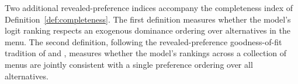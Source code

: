 Two additional revealed-preference indices accompany the completeness index of Definition~\ref{def:completeness}. The first definition measures whether the model's logit ranking respects an exogenous dominance ordering over alternatives in the menu. The second definition, following the revealed-preference goodness-of-fit tradition of \citet{houtman1985determining} and \citet{demuynck2023computing}, measures whether the model's rankings across a collection of menus are jointly consistent with a single preference ordering over all alternatives.


